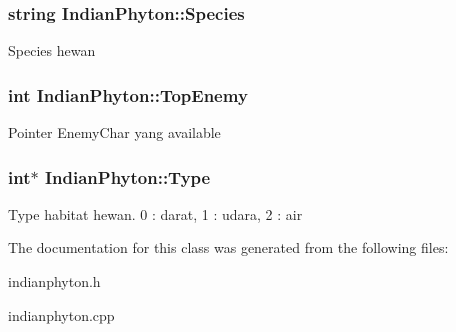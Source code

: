 \subsubsection[{\texorpdfstring{Species}{Species}}]{\setlength{\rightskip}{0pt plus 5cm}string Indian\+Phyton\+::\+Species\hspace{0.3cm}{\ttfamily [protected]}}\hypertarget{class_indian_phyton_a4c140a1de8195f136530bb8ea148e33f}{}\label{class_indian_phyton_a4c140a1de8195f136530bb8ea148e33f}
Species hewan 
\subsubsection[{\texorpdfstring{Top\+Enemy}{TopEnemy}}]{\setlength{\rightskip}{0pt plus 5cm}int Indian\+Phyton\+::\+Top\+Enemy\hspace{0.3cm}{\ttfamily [protected]}}\hypertarget{class_indian_phyton_ada8efc5d65c3c36a9b2f4c422893810c}{}\label{class_indian_phyton_ada8efc5d65c3c36a9b2f4c422893810c}
Pointer Enemy\+Char yang available 
\subsubsection[{\texorpdfstring{Type}{Type}}]{\setlength{\rightskip}{0pt plus 5cm}int$\ast$ Indian\+Phyton\+::\+Type\hspace{0.3cm}{\ttfamily [protected]}}\hypertarget{class_indian_phyton_a9798f27b0e5331587f03adb240deb1df}{}\label{class_indian_phyton_a9798f27b0e5331587f03adb240deb1df}
Type habitat hewan. 0 \+: darat, 1 \+: udara, 2 \+: air 

The documentation for this class was generated from the following files\+:\begin{DoxyCompactItemize}
\item 
indianphyton.\+h\item 
indianphyton.\+cpp\end{DoxyCompactItemize}
